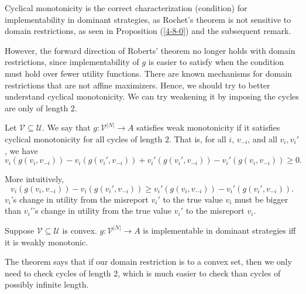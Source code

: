 Cyclical monotonicity is the correct characterization (condition) for implementability in dominant strategies, as Rochet's theorem is not sensitive to domain restrictions, as seen in Proposition (\ref{4-8-0}) and the subsequent remark.

However, the forward direction of Roberts' theorem no longer holds with domain restrictions, since implementability of $g$ is easier to satisfy when the condition must hold over fewer utility functions. There are known mechanisms for domain restrictions that are not affine maximizers. Hence, we should try to better understand cyclical monotonicity. We can try weakening it by imposing the cycles are only of length 2.

\begin{definition}
	Let $\mathscr{V} \subseteq \mathscr{U}$. We say that $g: \mathscr{V}^{\left| N \right|}\to A$ satisfies weak monotonicity if it satisfies cyclical monotonicity for all cycles of length $2$. That is, for all $i$, $v_{-i}$, and all $v_i, v_i'$, we have \[
		v_i\left( g\left( v_i, v_{-i} \right) \right) - v_i \left( g\left( v_{i}', v_{-i} \right) \right) + v_i'\left( g\left( v_i',v_{-i} \right) \right) - v_i'\left( g\left( v_i, v_{-i} \right) \right) \ge 0
	.\] 
\end{definition}
More intuitively, \[
	v_i\left( g(v_i,v_{-i}) \right) - v_i\left( g(v_i', v_{-i}) \right) \ge v_i'\left( g(v_i, v_{-i}) \right) - v_i'\left( g(v_i', v_{-i}) \right)
.\] 
$v_i$'s change in utility from the misreport $v_i'$ to the true value $v_i$ must be bigger than $v_i'$'s change in utility from the true value $v_i'$ to the misreport $v_i$.
\begin{theorem}
	Suppose $\mathscr{V} \subseteq \mathscr{U}$ is convex. $g: \mathscr{V}^{\left| N \right|}\to A$ is implementable in dominant strategies iff it is weakly monotonic.
\end{theorem}
The theorem says that if our domain restriction is to a convex set, then we only need to check cycles of length $2$, which is much easier to check than cycles of possibly infinite length.
